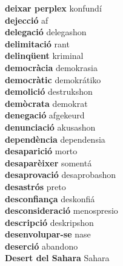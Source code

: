 \textbf{ deixar perplex  } konfundí \\
\textbf{ dejecció  } af \\
\textbf{ delegació  } delegashon \\
\textbf{ delimitació  } rant \\
\textbf{ delinqüent  } kriminal \\
\textbf{ democràcia  } demokrasia \\
\textbf{ democràtic  } demokrátiko \\
\textbf{ demolició  } destrukshon \\
\textbf{ demòcrata  } demokrat \\
\textbf{ denegació  } afgekeurd \\
\textbf{ denunciació  } akusashon \\
\textbf{ dependència  } dependensia \\
\textbf{ desaparició  } morto \\
\textbf{ desaparèixer  } somentá \\
\textbf{ desaprovació  } desaprobashon \\
\textbf{ desastrós  } preto \\
\textbf{ desconfiança  } deskonfiá \\
\textbf{ desconsideració  } menospresio \\
\textbf{ descripció  } deskripshon \\
\textbf{ desenvolupar-se  } nase \\
\textbf{ deserció  } abandono \\
\textbf{ Desert del Sahara  } Sahara \\
